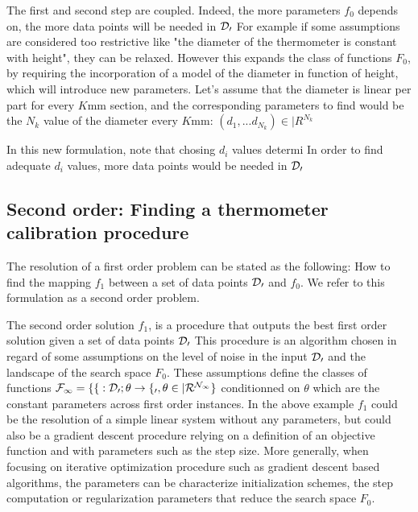 \begin{bibunit}
{{{{  The first and second step are coupled. Indeed, the more parameters $f_0$ depends on, the more data points will be needed in $\cal{D}_0$
  For example if some assumptions are considered too restrictive like "the diameter of the thermometer is constant with height", they can be relaxed.
  However this expands the class of functions $F_0$, by requiring the incorporation of a model of the diameter in function of height, which will introduce new parameters. Let's assume that the diameter is linear per part for every $K$mm section, and the corresponding parameters to find would be the $N_k$ value of the diameter every $K$mm: $(d_1, ... d_{N_k}) \in |R^{N_k}$ 

  In this new formulation, note that chosing $d_i$ values determi
  In order to find adequate $d_i$ values, more data points would be needed in $\cal{D}_0$

\subsection{Second order: Finding a thermometer calibration procedure}
  The resolution of a first order problem can be stated as the following: How to find the mapping $f_1$ between a set of data points $\cal{D}_0$ and $f_0$.
  We refer to this formulation as a second order problem.

  The second order solution $f_1$, is a procedure that outputs the best first order solution given a set of data points $\cal{D}_0$
  This procedure is an algorithm chosen in regard of some assumptions on the level of noise in the input $\cal{D}_0$ and the landscape of the search space $F_0$. These assumptions define the classes of functions $\cal{F}_1 = \{f: \cal{D}_0; \theta \to f_0, \theta \in |R^{N_1}\}$ conditionned on $\theta$ which are the constant parameters across first order instances.
  In the above example $f_1$ could be the resolution of a simple linear system without any parameters, but could also be a gradient descent procedure relying on a definition of an objective function and with parameters such as the step size. 
  More generally, when focusing on iterative optimization procedure such as gradient descent based algorithms, the parameters \theta can be characterize initialization schemes, the step computation or regularization parameters that reduce the search space $F_0$.



}}}}
\end{bibunit}
